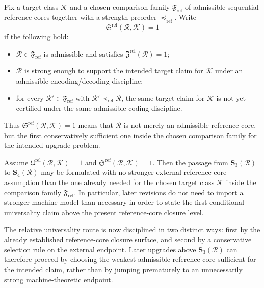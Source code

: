 \begin{definition}
Fix a target class \(\mathcal K\) and a chosen comparison family \(\mathfrak F_{\mathrm{ref}}\) of admissible sequential reference cores together with a strength preorder \(\preceq_{\mathrm{ref}}\). Write
\[
\mathfrak S^{\mathrm{ref}}(\mathcal R,\mathcal K)=1
\]
if the following hold:
\begin{itemize}[leftmargin=2em]
 \item \(\mathcal R\in\mathfrak F_{\mathrm{ref}}\) is admissible and satisfies \(\mathfrak Z^{\mathrm{ref}}(\mathcal R)=1\);
 \item \(\mathcal R\) is strong enough to support the intended target claim for \(\mathcal K\) under an admissible encoding/decoding discipline;
 \item for every \(\mathcal R'\in\mathfrak F_{\mathrm{ref}}\) with \(\mathcal R'\prec_{\mathrm{ref}}\mathcal R\), the same target claim for \(\mathcal K\) is not yet certified under the same admissible coding discipline.
\end{itemize}
Thus \(\mathfrak S^{\mathrm{ref}}(\mathcal R,\mathcal K)=1\) means that \(\mathcal R\) is not merely an admissible reference core, but the first conservatively sufficient one inside the chosen comparison family for the intended upgrade problem.
\end{definition}

\begin{proposition}
Assume \(\mathfrak U^{\mathrm{rel}}(\mathcal R,\mathcal K)=1\) and \(\mathfrak S^{\mathrm{ref}}(\mathcal R,\mathcal K)=1\). Then the passage from \(\mathbf S_3(\mathcal R)\) to \(\mathbf S_4(\mathcal R)\) may be formulated with no stronger external reference-core assumption than the one already needed for the chosen target class \(\mathcal K\) inside the comparison family \(\mathfrak F_{\mathrm{ref}}\). In particular, later revisions do not need to import a stronger machine model than necessary in order to state the first conditional universality claim above the present reference-core closure level.
\end{proposition}

\begin{corollary}
The relative universality route is now disciplined in two distinct ways: first by the already established reference-core closure surface, and second by a conservative selection rule on the external endpoint. Later upgrades above \(\mathbf S_3(\mathcal R)\) can therefore proceed by choosing the weakest admissible reference core sufficient for the intended claim, rather than by jumping prematurely to an unnecessarily strong machine-theoretic endpoint.
\end{corollary}


